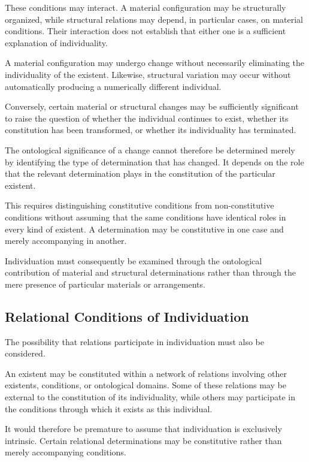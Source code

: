 These conditions may interact. A material configuration
may be structurally organized, while structural relations
may depend, in particular cases, on material conditions.
Their interaction does not establish that either one is
a sufficient explanation of individuality.

A material configuration may undergo change without
necessarily eliminating the individuality of the existent.
Likewise, structural variation may occur without automatically
producing a numerically different individual.

Conversely, certain material or structural changes may be
sufficiently significant to raise the question of whether
the individual continues to exist, whether its constitution
has been transformed, or whether its individuality has
terminated.

The ontological significance of a change cannot therefore
be determined merely by identifying the type of determination
that has changed. It depends on the role that the relevant
determination plays in the constitution of the particular
existent.

This requires distinguishing constitutive conditions from
non-constitutive conditions without assuming that the same
conditions have identical roles in every kind of existent.
A determination may be constitutive in one case and merely
accompanying in another.

Individuation must consequently be examined through the
ontological contribution of material and structural
determinations rather than through the mere presence of
particular materials or arrangements.

\subsection{Relational Conditions of Individuation}

The possibility that relations participate in individuation
must also be considered.

An existent may be constituted within a network of relations
involving other existents, conditions, or ontological domains.
Some of these relations may be external to the constitution
of its individuality, while others may participate in the
conditions through which it exists as this individual.

It would therefore be premature to assume that individuation
is exclusively intrinsic. Certain relational determinations
may be constitutive rather than merely accompanying conditions.

